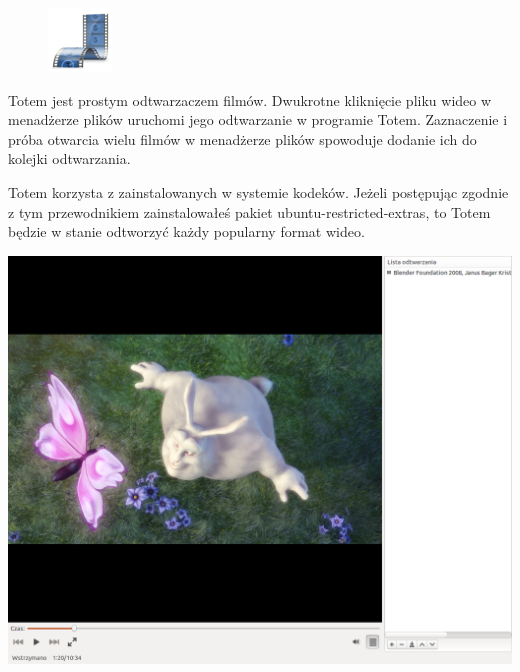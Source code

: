 \label{totem}\begin{figure}
	\vspace{-10pt}
	\includegraphics[width=\linewidth]{images/ikony_totem.png}
\end{figure}

Totem jest prostym odtwarzaczem filmów. Dwukrotne kliknięcie pliku wideo w menadżerze plików uruchomi jego odtwarzanie w programie Totem. Zaznaczenie i próba otwarcia wielu filmów w menadżerze plików spowoduje dodanie ich do kolejki odtwarzania. 

Totem korzysta z zainstalowanych w systemie kodeków. Jeżeli postępując zgodnie z tym przewodnikiem zainstalowałeś pakiet \textcolor{ubuntu_orange}{ubuntu-restricted-extras}, to Totem będzie w stanie odtworzyć każdy popularny format wideo.
\begin{center}
	\includegraphics[width=\linewidth]{images/programy_totem1.png}
\end{center}

